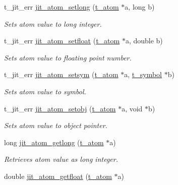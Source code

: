 \begin{DoxyCompactItemize}
\item 
t\_\-jit\_\-err \hyperlink{group__atommod_ga3ba793bf8d970488f7fdee721fafcc16}{jit\_\-atom\_\-setlong} (\hyperlink{structt__atom}{t\_\-atom} $\ast$a, long b)
\begin{DoxyCompactList}\small\item\em Sets atom value to long integer. \item\end{DoxyCompactList}\item 
t\_\-jit\_\-err \hyperlink{group__atommod_gafa6fc51c30c70d54d6dd4af45042d3bd}{jit\_\-atom\_\-setfloat} (\hyperlink{structt__atom}{t\_\-atom} $\ast$a, double b)
\begin{DoxyCompactList}\small\item\em Sets atom value to floating point number. \item\end{DoxyCompactList}\item 
t\_\-jit\_\-err \hyperlink{group__atommod_ga8034b94e985f9c616c108fdf426ebcf4}{jit\_\-atom\_\-setsym} (\hyperlink{structt__atom}{t\_\-atom} $\ast$a, \hyperlink{structt__symbol}{t\_\-symbol} $\ast$b)
\begin{DoxyCompactList}\small\item\em Sets atom value to symbol. \item\end{DoxyCompactList}\item 
t\_\-jit\_\-err \hyperlink{group__atommod_gaa32f4a02a9c8b281043220b713d15e3e}{jit\_\-atom\_\-setobj} (\hyperlink{structt__atom}{t\_\-atom} $\ast$a, void $\ast$b)
\begin{DoxyCompactList}\small\item\em Sets atom value to object pointer. \item\end{DoxyCompactList}\item 
long \hyperlink{group__atommod_gaf63b5b3ffc46134bed05adf071a7d52a}{jit\_\-atom\_\-getlong} (\hyperlink{structt__atom}{t\_\-atom} $\ast$a)
\begin{DoxyCompactList}\small\item\em Retrieves atom value as long integer. \item\end{DoxyCompactList}\item 
double \hyperlink{group__atommod_gae5882d0bf97c939882126ba235eee409}{jit\_\-atom\_\-getfloat} (\hyperlink{structt__atom}{t\_\-atom} $\ast$a)

\end{DoxyCompactItemize}
